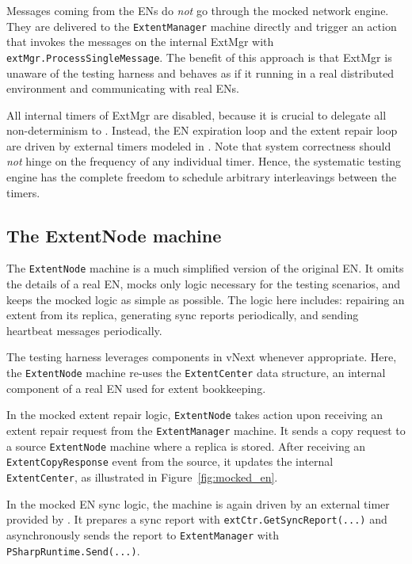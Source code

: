 Messages coming from the ENs do {\em not} go through the mocked network engine. They are delivered to the \texttt{ExtentManager} machine directly and trigger an action that invokes the messages on the internal ExtMgr with \texttt{extMgr.ProcessSingleMessage}. The benefit of this approach is that ExtMgr is unaware of the testing harness and behaves as if it running in a real distributed environment and communicating with real ENs.

All internal timers of ExtMgr are disabled, because it is crucial to delegate all non-determinism to \psharp. Instead, the EN expiration loop and the extent repair loop are driven by external timers modeled in \psharp. Note that system correctness should {\em not} hinge on the frequency of any individual timer. Hence, the \psharp systematic testing engine has the complete freedom to schedule arbitrary interleavings between the timers.

\subsection{The ExtentNode machine}
\label{sec:method:mock_en}

The \texttt{ExtentNode} machine is a much simplified version of the original EN. It omits the details of a real EN, mocks only logic necessary for the testing scenarios, and keeps the mocked logic as simple as possible. The logic here includes: repairing an extent from its replica, generating sync reports periodically, and sending heartbeat messages periodically.

The testing harness leverages components in vNext whenever appropriate. Here, the \texttt{ExtentNode} machine re-uses the \texttt{ExtentCenter} data structure, an internal component of a real EN used for extent bookkeeping.

In the mocked extent repair logic, \texttt{ExtentNode} takes action upon receiving an extent repair request from the \texttt{ExtentManager} machine. It sends a copy request to a source \texttt{ExtentNode} machine where a replica is stored. After receiving an \texttt{ExtentCopyResponse} event from the source, it updates the internal \texttt{ExtentCenter}, as illustrated in Figure~\ref{fig:mocked_en}. 

In the mocked EN sync logic, the machine is again driven by an external timer provided by \psharp. It prepares a sync report with \texttt{extCtr.GetSyncReport(...)} and asynchronously sends the report to \texttt{ExtentManager} with \texttt{PSharpRuntime.Send(...)}.

